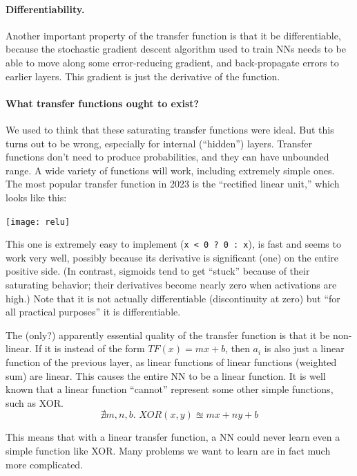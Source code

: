 \documentclass[twocolumn]{article}
\begin{document}
\paragraph{Differentiability.}
Another important property of the transfer function is that it be
differentiable, because the stochastic gradient descent algorithm used
to train NNs needs to be able to move along some error-reducing
gradient, and back-propagate errors to earlier layers. This gradient
is just the derivative of the function.

\paragraph{What transfer functions ought to exist?}
We used to think that these saturating transfer functions were ideal.
But this turns out to be wrong, especially for internal (``hidden'')
layers. Transfer functions don't need to produce probabilities, and
they can have unbounded range. A wide variety of functions will work,
including extremely simple ones. The most popular transfer function in
2023 is the ``rectified linear unit,'' which looks like this:

\begin{center}
\texttt{[image: relu]}
\end{center}

This one is extremely easy to implement (\verb+x < 0 ? 0 : x+), is
fast and seems to work very well, possibly because its derivative is
significant (one) on the entire positive side. (In contrast, sigmoids
tend to get ``stuck'' because of their saturating behavior; their
derivatives become nearly zero when activations are high.) Note that
it is not actually differentiable (discontinuity at zero) but ``for
all practical purposes'' it is differentiable.

The (only?) apparently essential quality of the transfer function is
that it be non-linear. If it is instead of the form $TF(x) = mx + b$,
then $a_i$ is also just a linear function of the previous layer, as
linear functions of linear functions (weighted sum) are linear. This
causes the entire NN to be a linear function. It is well known that a
linear function ``cannot'' represent some other simple functions, such
as XOR.
%
$$\nexists m,n,b.\,\, XOR(x, y) \approxeq m x + n y + b$$

This means that with a linear transfer function, a NN could never
learn even a simple function like XOR. Many problems we want to learn
are in fact much more complicated.
\end{document}

